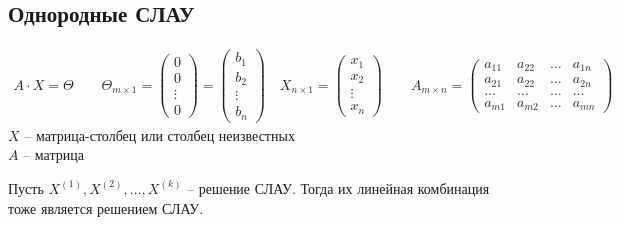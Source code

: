 \subsection{Однородные СЛАУ}
\begin{gather*}
A \cdot X = \Theta \qquad \Theta_{m\times 1} = \begin{pmatrix}
0\\
0\\
\vdots\\
0
\end{pmatrix} = \begin{pmatrix}
b_1\\
b_2\\
\vdots\\
b_n
\end{pmatrix} \quad X_{n\times 1} = \begin{pmatrix}
x_1 \\
x_2 \\
\vdots\\
x_n
\end{pmatrix} \qquad  A_{m\times n} = \begin{pmatrix}
a_{11} & a_{22} & \ldots & a_{1n} \\
a_{21} & a_{22} & \ldots & a_{2n} \\
\ldots & \ldots & \ldots & \ldots \\
a_{m1} & a_{m2} & \ldots & a_{mn} 
\end{pmatrix}
\end{gather*}
$X$ -- матрица-столбец или столбец неизвестных\\
$A$ -- матрица
\begin{theorem}
Пусть $X^{(1)}, X^{(2)},\ldots, X^{(k)}$ -- решение СЛАУ. Тогда их линейная комбинация тоже является решением СЛАУ.
\end{theorem} 
